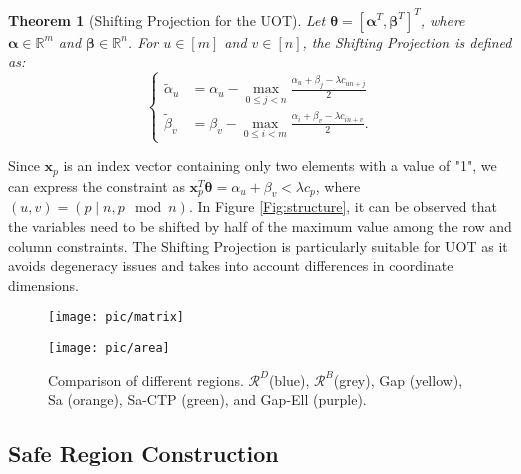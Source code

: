 \documentclass[11pt]{article}
\newtheorem{thm}{Theorem}
\newcommand{\R}{\mathbb{R}}
\renewcommand{\vec}[1]{\bm{#1}}
\begin{document}
\begin{thm}[Shifting Projection for the UOT]
\label{Thm:UOT_ShiftProjection}
Let $\vec{\theta} = [{\vec{\alpha}}^T,{\vec{\beta}}^T]^T$, where $\vec{\alpha}\in\R^{m}$ and $\vec{\beta}\in\R^{n}$. For $u \in [m]$ and $v \in [n]$, the Shifting Projection is defined as:
\begin{equation}
\left\{
\begin{array}{ll}
\label{eq:uotproj}
\tilde{{\alpha}}_u &= \displaystyle{{{\alpha}}_u - \max_{0\leq j < n} \frac{{{\alpha}}_u +{{\beta}}_j - \lambda{c}_{un+j}}{2}} \\
\tilde{{\beta}}_v &= \displaystyle{{{\beta}}_v - \max_{0 \leq i < m} \frac{{{\alpha}}_i +{{\beta}}_v - \lambda{c}_{in+v}}{2}}.
\end{array}
\right.
\end{equation}
\end{thm}
Since $\vec x_p$ is an index vector containing only two elements with a value of "1", we can express the constraint as $\vec x_p^{T}\vec\theta = \alpha_{u} + \beta_{v} < \lambda c_p$, where $(u,v)=(p \mid n,p \mod n)$. In Figure \ref{Fig:structure}, it can be observed that the variables need to be shifted by half of the maximum value among the row and column constraints. The Shifting Projection is particularly suitable for UOT as it avoids degeneracy issues and takes into account differences in coordinate dimensions.

\begin{figure}[t]
\centering
\begin{minipage}[t]{0.48\textwidth}
  \centering
  \texttt{[image: pic/matrix]}
  \caption{Example of Shifting Projection. Arranging $mn$ constraints into a yellow matrix. The light yellow blocks show the constraints that directly affect the corresponding elements.}
  \label{Fig:structure}
\end{minipage}
\hfill
\begin{minipage}[t]{0.48\textwidth}
  \centering
  \texttt{[image: pic/area]}
  \caption{Comparison of different regions. $\mathcal{R}^{D}$(blue), $\mathcal{R}^{B}$(grey), Gap (yellow), Sa (orange), Sa-CTP (green), and Gap-Ell (purple).}
  \label{Fig:area}
\end{minipage}
\end{figure}


\subsection{Safe Region Construction}
\label{Sec:Ell}
\end{document}
